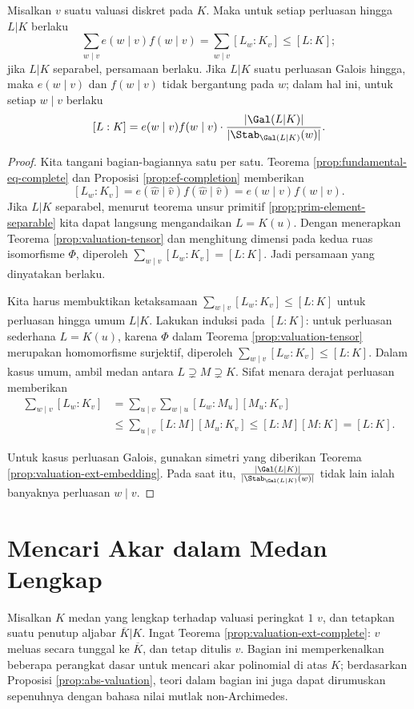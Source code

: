 \begin{corollary}\label{prop:fundamental-eq}
	Misalkan $v$ suatu valuasi diskret pada $K$. Maka untuk setiap perluasan hingga $L|K$ berlaku
	\[ \sum_{w \mid v} e(w \mid v) f(w \mid v) = \sum_{w \mid v} [L_w : K_v] \leq [L:K]; \]
	jika $L|K$ separabel, persamaan berlaku. Jika $L|K$ suatu perluasan Galois hingga, maka $e(w \mid v)$ dan $f(w \mid v)$ tidak bergantung pada $w$; dalam hal ini, untuk setiap $w \mid v$ berlaku
	\[ [L:K] = e(w \mid v) f(w \mid v) \cdot \frac{|\Gal(L|K)|}{|\Stab_{\Gal(L|K)}(w)|}. \]
\end{corollary}
\begin{proof}
	Kita tangani bagian-bagiannya satu per satu. Teorema \ref{prop:fundamental-eq-complete} dan Proposisi \ref{prop:ef-completion} memberikan
	\[ [L_w:K_v] = e(\hat{w} \mid \hat{v}) f(\hat{w} \mid \hat{v}) = e(w \mid v) f(w \mid v). \]
	Jika $L|K$ separabel, menurut teorema unsur primitif \ref{prop:prim-element-separable} kita dapat langsung mengandaikan $L=K(u)$. Dengan menerapkan Teorema \ref{prop:valuation-tensor} dan menghitung dimensi pada kedua ruas isomorfisme $\Phi$, diperoleh $\sum_{w \mid v} [L_w : K_v] = [L:K]$. Jadi persamaan yang dinyatakan berlaku.
	
	Kita harus membuktikan ketaksamaan $\sum_{w \mid v} [L_w : K_v] \leq [L:K]$ untuk perluasan hingga umum $L|K$. Lakukan induksi pada $[L:K]$: untuk perluasan sederhana $L=K(u)$, karena $\Phi$ dalam Teorema \ref{prop:valuation-tensor} merupakan homomorfisme surjektif, diperoleh $\sum_{w \mid v} [L_w : K_v] \leq [L:K]$. Dalam kasus umum, ambil medan antara $L \supsetneq M \supsetneq K$. Sifat menara derajat perluasan memberikan
	\begin{align*}
		\sum_{w \mid v} [L_w : K_v] & = \sum_{u \mid v} \sum_{w \mid u} [L_w : M_u] [M_u : K_v] \\
		& \leq \sum_{u \mid v} [L:M] [M_u:K_v] \leq [L:M][M:K] = [L:K].
	\end{align*}

	Untuk kasus perluasan Galois, gunakan simetri yang diberikan Teorema \ref{prop:valuation-ext-embedding}. Pada saat itu, $\frac{|\Gal(L|K)|}{|\Stab_{\Gal(L|K)}(w)|}$ tidak lain ialah banyaknya perluasan $w \mid v$.
\end{proof}

\section{Mencari Akar dalam Medan Lengkap}
Misalkan $K$ medan yang lengkap terhadap valuasi peringkat $1$ $v$, dan tetapkan suatu penutup aljabar $\overline{K}|K$. Ingat Teorema \ref{prop:valuation-ext-complete}: $v$ meluas secara tunggal ke $\overline{K}$, dan tetap ditulis $v$. Bagian ini memperkenalkan beberapa perangkat dasar untuk mencari akar polinomial di atas $K$; berdasarkan Proposisi \ref{prop:abs-valuation}, teori dalam bagian ini juga dapat dirumuskan sepenuhnya dengan bahasa nilai mutlak non-Archimedes.

